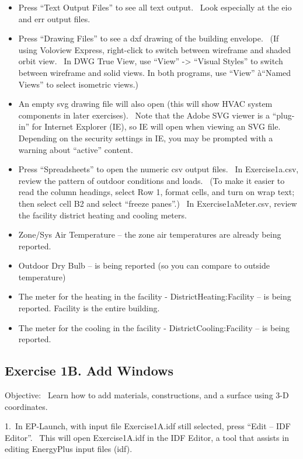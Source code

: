 \begin{itemize}
\item
  Press ``Text Output Files'' to see all text output.~ Look especially at the eio and err output files.
\item
  Press ``Drawing Files'' to see a dxf drawing of the building envelope.~ (If using Voloview Express, right-click to switch between wireframe and shaded orbit view.~ In DWG True View, use ``View'' -\textgreater{} ``Visual Styles'' to switch between wireframe and solid views. In both programs, use ``View'' à``Named Views'' to select isometric views.)
\item
  An empty svg drawing file will also open (this will show HVAC system components in later exercises).~ Note that the Adobe SVG viewer is a ``plug-in'' for Internet Explorer (IE), so IE will open when viewing an SVG file.~ Depending on the security settings in IE, you may be prompted with a warning about ``active'' content.
\item
  Press ``Spreadsheets'' to open the numeric csv output files.~ In Exercise1a.csv, review the pattern of outdoor conditions and loads.~ (To make it easier to read the column headings, select Row 1, format cells, and turn on wrap text; then select cell B2 and select ``freeze panes''.) ~In Exercise1aMeter.csv, review the facility district heating and cooling meters.
\item
  Zone/Sys Air Temperature -- the zone air temperatures are already being reported.
\item
  Outdoor Dry Bulb -- is being reported (so you can compare to outside temperature)
\item
  The meter for the heating in the facility - DistrictHeating:Facility -- is being reported. Facility is the entire building.
\item
  The meter for the cooling in the facility - DistrictCooling:Facility -- is being reported.
\end{itemize}

\subsection{Exercise 1B. Add Windows}\label{exercise-1b.-add-windows}

Objective:~ Learn how to add materials, constructions, and a surface using 3-D coordinates.

1.~In EP-Launch, with input file Exercise1A.idf still selected, press ``Edit -- IDF Editor''.~ This will open Exercise1A.idf in the IDF Editor, a tool that assists in editing EnergyPlus input files (idf).

